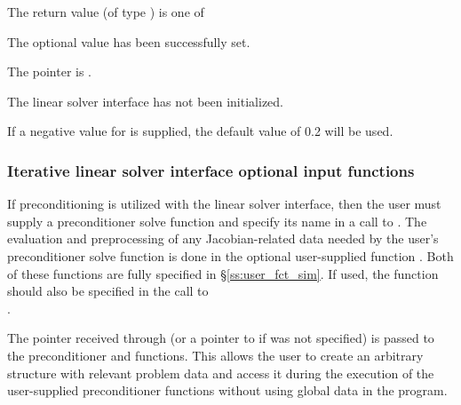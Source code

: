 {
  The return value  (of type ) is one of
  \begin{args}
  \item[\Id{CVDLS\_SUCCESS}] 
    The optional value has been successfully set.
  \item[\Id{CVDLS\_MEM\_NULL}]
    The  pointer is .
  \item[\Id{CVDLS\_LMEM\_NULL}]
    The {\cvdls} linear solver interface has not been initialized.
  \end{args}
}
{
  If a negative value for  is supplied, the default value of
  0.2 will be used.
}


\subsubsection{Iterative linear solver interface optional input functions}\label{sss:optin_spils}
If preconditioning is utilized with the {\cvspils} linear
solver interface, then the user must supply a preconditioner solve
function  and specify its name in a call to
. 
The evaluation and preprocessing of any Jacobian-related data needed
by the user's preconditioner solve function is done in the optional
user-supplied function . Both of these functions are
fully specified in \S\ref{ss:user_fct_sim}.
If used, the  function should also be specified in the call to\\
\noindent{}.

The pointer  received through  (or
a pointer to  if  was not specified) 
is passed to the preconditioner  and  functions.  
This allows the user to create an arbitrary structure with relevant problem data 
and access it during the execution of the user-supplied preconditioner functions
without using global data in the program.  

